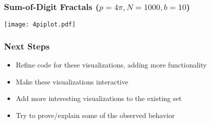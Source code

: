 \documentclass[leqno,handout]{beamer}
\begin{document}
\begin{frame}

\frametitle{Sum-of-Digit Fractals ($p = 4 \pi, N = 1000, b = 10$)} 

\begin{center}
        \texttt{[image: 4piplot.pdf]}
        \\
        \end{center}
\end{frame} 

























\begin{frame} 

    
\frametitle{Next Steps} 


	\begin{itemize}

	    \item Refine code for these visualizations, adding more functionality
	    \item Make these visualizations interactive
	    \item Add more interesting visualizations to the existing set
	    \item Try to prove/explain some of the observed behavior

    \end{itemize}
	

\end{frame} 

\end{document}

